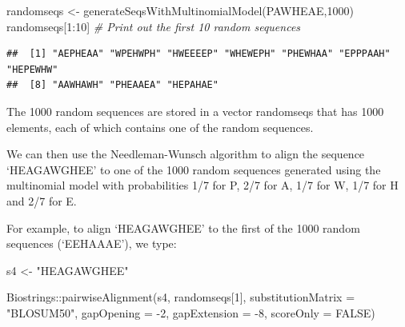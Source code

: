 \documentclass[
]{book}
\newenvironment{Shaded}{\begin{snugshade}}{\end{snugshade}}
\newcommand{\AttributeTok}[1]{\textcolor[rgb]{0.77,0.63,0.00}{#1}}
\newcommand{\CommentTok}[1]{\textcolor[rgb]{0.56,0.35,0.01}{\textit{#1}}}
\newcommand{\ConstantTok}[1]{\textcolor[rgb]{0.00,0.00,0.00}{#1}}
\newcommand{\DecValTok}[1]{\textcolor[rgb]{0.00,0.00,0.81}{#1}}
\newcommand{\FunctionTok}[1]{\textcolor[rgb]{0.00,0.00,0.00}{#1}}
\newcommand{\NormalTok}[1]{#1}
\newcommand{\OtherTok}[1]{\textcolor[rgb]{0.56,0.35,0.01}{#1}}
\newcommand{\SpecialCharTok}[1]{\textcolor[rgb]{0.00,0.00,0.00}{#1}}
\newcommand{\StringTok}[1]{\textcolor[rgb]{0.31,0.60,0.02}{#1}}
\begin{document}
\begin{Shaded}
\begin{Highlighting}[]
\NormalTok{randomseqs }\OtherTok{\textless{}{-}} \FunctionTok{generateSeqsWithMultinomialModel}\NormalTok{(}\StringTok{\textquotesingle{}PAWHEAE\textquotesingle{}}\NormalTok{,}\DecValTok{1000}\NormalTok{)}
\NormalTok{randomseqs[}\DecValTok{1}\SpecialCharTok{:}\DecValTok{10}\NormalTok{] }\CommentTok{\# Print out the first 10 random sequences}
\end{Highlighting}
\end{Shaded}

\begin{verbatim}
##  [1] "AEPHEAA" "WPEHWPH" "HWEEEEP" "WHEWEPH" "PHEWHAA" "EPPPAAH" "HEPEWHW"
##  [8] "AAWHAWH" "PHEAAEA" "HEPAHAE"
\end{verbatim}

The 1000 random sequences are stored in a vector randomseqs that has 1000 elements, each of which contains one of the random sequences.

We can then use the Needleman-Wunsch algorithm to align the sequence `HEAGAWGHEE' to one of the 1000 random sequences generated using the multinomial model with probabilities 1/7 for P, 2/7 for A, 1/7 for W, 1/7 for H and 2/7 for E.

For example, to align `HEAGAWGHEE' to the first of the 1000 random sequences (`EEHAAAE'), we type:

\begin{Shaded}
\begin{Highlighting}[]
\NormalTok{s4 }\OtherTok{\textless{}{-}} \StringTok{"HEAGAWGHEE"}
\end{Highlighting}
\end{Shaded}

\begin{Shaded}
\begin{Highlighting}[]
\NormalTok{Biostrings}\SpecialCharTok{::}\FunctionTok{pairwiseAlignment}\NormalTok{(s4, randomseqs[}\DecValTok{1}\NormalTok{], }
                              \AttributeTok{substitutionMatrix =} \StringTok{"BLOSUM50"}\NormalTok{, }
                              \AttributeTok{gapOpening =} \SpecialCharTok{{-}}\DecValTok{2}\NormalTok{,}
                              \AttributeTok{gapExtension =} \SpecialCharTok{{-}}\DecValTok{8}\NormalTok{, }
                              \AttributeTok{scoreOnly =} \ConstantTok{FALSE}\NormalTok{)}
\end{Highlighting}
\end{Shaded}
\end{document}
